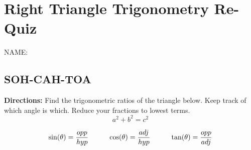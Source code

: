 \documentclass[12pt]{article}
\begin{document}
\section*{Right Triangle Trigonometry Re-Quiz}

\vspace{12pt}

 \hfill NAME:\underline{\hspace{3in}}\\
 


\subsection*{SOH-CAH-TOA}

\textbf{Directions:} Find the trigonometric ratios of the triangle below. Keep track of which angle is which. Reduce your fractions to lowest terms.\\

$$a^2+b^2=c^2$$

$$\sin(\theta)=\dfrac{opp}{hyp} \hspace{1cm} \cos(\theta)=\dfrac{adj}{hyp} \hspace*{1cm} \tan(\theta)=\dfrac{opp}{adj}$$
\begin{center}
\end{center}
\end{document}
